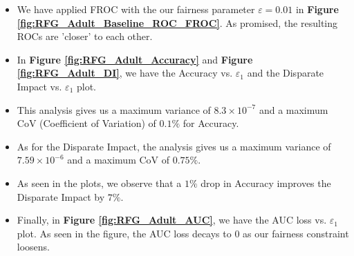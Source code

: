 \documentclass{article}
\newcommand{\ouralgo}{\texttt{FROC}}
\begin{document}
        
        
\begin{itemize}
    \item We have applied FROC with the our fairness parameter $\varepsilon = 0.01$ in \textbf{Figure \ref{fig:RFG_Adult_Baseline_ROC_FROC}}. As promised, the resulting ROCs are 'closer' to each other.
    \item In \textbf{Figure \ref{fig:RFG_Adult_Accuracy}} and \textbf{Figure \ref{fig:RFG_Adult_DI}}, we have the Accuracy vs. $\varepsilon_1$ and the Disparate Impact vs. $\varepsilon_1$ plot.
    \item This analysis gives us a maximum variance of $8.3\times10^{-7}$ and a maximum CoV (Coefficient of Variation) of $0.1\%$ for Accuracy.
    \item As for the Disparate Impact, the analysis gives us a maximum variance of $7.59\times10^{-6}$ and a maximum CoV of $0.75\%$.
    \item As seen in the plots, we observe that a $1\%$ drop in Accuracy improves the Disparate Impact by $7\%$.
    \item Finally, in \textbf{Figure \ref{fig:RFG_Adult_AUC}}, we have the AUC loss vs. $\varepsilon_1$ plot. As seen in the figure, the AUC loss decays to $0$ as our fairness constraint loosens.
\end{itemize}
\end{document}
